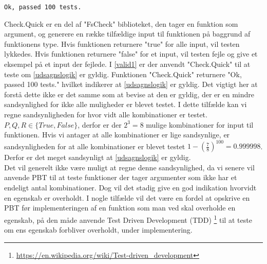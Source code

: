 \begin{lstlisting}[style=output, label={lst:output_example}, caption={Output \ref{valid1}}]
Ok, passed 100 tests.
\end{lstlisting}

Check.Quick er en del af "FsCheck" biblioteket, den tager en funktion som argument, og generere en række tilfældige input til funktionen på baggrund af funktionens type. Hvis funktionen returnere "true" for alle input, vil testen lykkedes. Hvis funktionen returnere "false" for et input, vil testen fejle og give et eksempel på et input der fejlede. I \ref{valid1} er der anvendt "Check.Quick" til at teste om \ref{udsagnslogik} er gyldig. Funktionen "Check.Quick" returnere "Ok, passed 100 tests." hvilket indikerer at \ref{udsagnslogik} er gyldig. Det vigtigt her at forstå dette ikke er det samme som at bevise at den er gyldig, der er en mindre sandsynlighed for ikke alle muligheder er blevet testet. I dette tilfælde kan vi regne sandsynligheden for hvor vidt alle kombinationer er testet. $P, Q, R \in \{True, False\}$, derfor er der $2^3 = 8$ mulige kombinationer for input til funktionen. Hvis vi antager at alle kombinationer er lige sandsynlige, er sandsynligheden for at alle kombinationer er blevet testet $1 - (\frac{7}{8})^{100} = 0.999998$. Derfor er det meget sandsynligt at \ref{udsagnslogik} er gyldig.\\
Det vil generelt ikke være muligt at regne denne sandsynlighed, da vi senere vil anvende PBT til at teste funktioner der tager argumenter som ikke har et endeligt antal kombinationer. Dog vil det stadig give en god indikation hvorvidt en egenskab er overholdt. I nogle tilfælde vil det være en fordel at opskrive en PBT før implementeringen af en funktion som man ved skal overholde en egenskab, på den måde anvende Test Driven Development (TDD) \footnote{\url{https://en.wikipedia.org/wiki/Test-driven_development}} til at teste om ens egenskab forbliver overholdt, under implementering.
